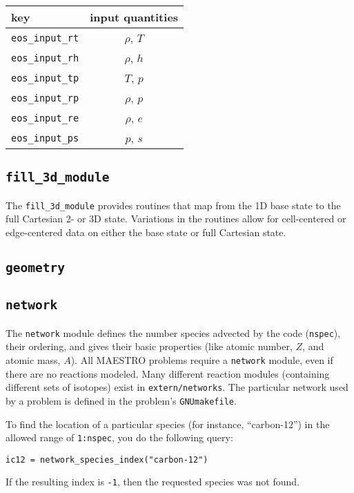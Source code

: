    \begin{center}
   \begin{tabular}{lc}
   \hline
   key            & input quantities \\
   \hline
   {\tt eos\_input\_rt}       & $\rho$, $T$ \\
   {\tt eos\_input\_rh}       & $\rho$, $h$ \\
   {\tt eos\_input\_tp}       & $T$, $p$ \\
   {\tt eos\_input\_rp}       & $\rho$, $p$ \\
   {\tt eos\_input\_re}       & $\rho$, $e$ \\
   {\tt eos\_input\_ps}       & $p$, $s$ \\
   \hline
   \end{tabular}
   \end{center}




\subsection{{\tt fill\_3d\_module}}

The {\tt fill\_3d\_module} provides routines that map from the 1D
base state to the full Cartesian 2- or 3D state.  Variations in the
routines allow for cell-centered or edge-centered data on either the
base state or full Cartesian state.

\subsection{{\tt geometry}}

\subsection{{\tt network}}

The {\tt network} module defines the number species advected by the
code ({\tt nspec}), their ordering, and gives their basic properties
(like atomic number, $Z$, and atomic mass, $A$).  All MAESTRO problems
require a {\tt network} module, even if there are no reactions
modeled.  Many different reaction modules (containing different sets
of isotopes) exist in {\tt extern/networks}.  The particular network
used by a problem is defined in the problem's {\tt GNUmakefile}.

To find the location of a particular species (for instance, ``carbon-12'')
in the allowed range of {\tt 1:nspec}, you do the following query:
\begin{lstlisting}[language={[95]fortran},mathescape=false]
  ic12 = network_species_index("carbon-12")
\end{lstlisting}
If the resulting index is {\tt -1}, then the requested species was not
found.

